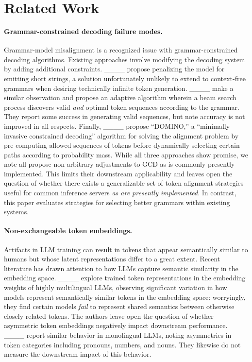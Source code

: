 \section{Related Work}
\paragraph{Grammar-constrained decoding failure modes.}
Grammar-model misalignment is a recognized issue with grammar-constrained decoding algorithms.
Existing approaches involve modifying the decoding system by adding additional constraints.
____ propose penalizing the model for emitting short strings, a solution unfortunately unlikely to extend to context-free grammars when desiring technically infinite token generation.
____ make a similar observation and propose an adaptive algorithm wherein a beam search process discovers valid \emph{and} optimal token sequences according to the grammar.
They report some success in generating valid sequences, but note accuracy is not improved in all respects.
Finally, ____ propose ``DOMINO,'' a ``minimally invasive constrained decoding'' algorithm for solving the alignment problem by pre-computing allowed sequences of tokens before dynamically selecting certain paths according to probability mass.
While all three approaches show promise, we note all propose non-arbitrary adjustments to GCD as is commonly presently implemented.
This limits their downstream applicability and leaves open the question of whether there exists a generalizable set of token alignment strategies useful for common inference servers \emph{as are presently implemented}.
In contrast, this paper evaluates strategies for selecting better grammars within existing systems.

\paragraph{Non-exchangeable token embeddings.}
Artifacts in LLM training can result in tokens that appear semantically similar to humans but whose latent representations differ to a great extent.
Recent literature has drawn attention to how LLMs capture semantic similarity in the embedding space.
____ explore trained token representations in the embedding weights of highly multilingual LLMs, observing significant variation in how models represent semantically similar tokens in the embedding space: worryingly, they find certain models \emph{fail} to represent shared semantics between otherwise closely related tokens.
The authors leave open the question of whether asymmetric token embeddings negatively impact downstream performance.
____ report similar behavior in  monolingual LLMs, noting asymmetries in token categories including pronouns, numbers, and nouns.
They likewise do not measure the downstream impact of this behavior.

